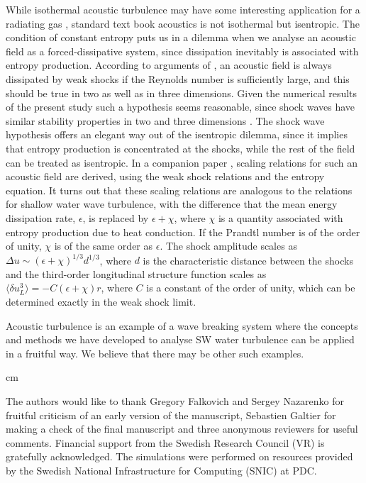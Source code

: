 While isothermal acoustic turbulence may have some interesting application for a radiating gas \citep[]{Stein1967}, standard text book acoustics is not isothermal but isentropic. The  condition of constant entropy puts us in a dilemma when we analyse an acoustic field as a forced-dissipative system, since dissipation inevitably is associated with entropy production.  According to arguments of \cite{KadomtsevPet1973}, an acoustic field is always dissipated by weak shocks if the Reynolds number is sufficiently large,  and this should be true in two as well as in three dimensions.  Given the numerical results of the present study such a hypothesis seems reasonable, since shock waves have similar stability properties
in two and three dimensions \citep[]{ApazidisEliasson2018, LivertsApazidis2016}.  The shock wave hypothesis offers an elegant way out of the isentropic dilemma, since it implies that entropy production is concentrated at the shocks, while the rest of the field can be treated as isentropic. In a companion paper \citep[]{Lindborg2019}, scaling relations for such an acoustic field are derived, using the weak shock relations and the entropy equation. It turns out that these scaling relations are analogous to the relations for shallow water wave turbulence, with the  difference
that the mean energy dissipation rate, $ \epsilon $, is replaced by $ \epsilon + \chi $, where $ \chi $ is a quantity associated with entropy production due to heat conduction. If  the Prandtl number is of the order of unity, $ \chi $ is of the same order as $ \epsilon $.  The shock amplitude scales as $ \Delta u \sim (\epsilon + \chi)^{1/3} d^{1/3} $, where $ d $ is the characteristic distance between the shocks and the third-order longitudinal structure function scales as $ \langle \delta u_L^{3} \rangle = -C (\epsilon + \chi)r $, where $ C $ is a constant of the order of unity, which can be determined exactly in the weak shock limit.

Acoustic turbulence is an example of a wave breaking system where the concepts and methods we have developed to analyse SW water turbulence can be applied in a fruitful way.  We believe that there may be other such examples.


 cm

\noindent The authors would like to thank Gregory Falkovich and Sergey Nazarenko for  fruitful criticism of an early version of the manuscript, Sebastien Galtier for making a check of the final manuscript and three anonymous reviewers for useful comments. Financial
support from the Swedish Research Council (VR) is gratefully
acknowledged. The simulations were performed
on resources provided by the Swedish National Infrastructure
for Computing (SNIC) at PDC.



